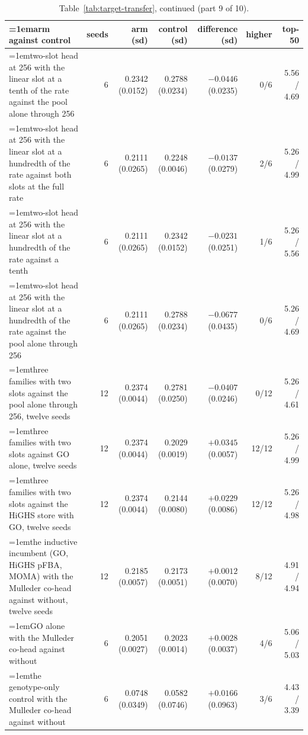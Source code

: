 \begin{table}[H]
  \centering
  \footnotesize
  \setlength{\tabcolsep}{2.5pt}
  \caption[The rounds on betaxanthin: arm against control, continued]{Table~\ref{tab:target-transfer}, continued (part 9 of 10).}
  \label{tab:target-transfer-9}
  \begin{tabular}{@{}>{\raggedright\hangindent=1em\hangafter=1\arraybackslash}p{78.5mm}rrrrrr@{}}
    \hline
    arm against control & seeds & arm (sd) & control (sd) & difference (sd) & higher & top-50 \\
    \hline
    two-slot head at 256 with the linear slot at a tenth of the rate against the pool alone through 256 & 6 & 0.2342 (0.0152) & 0.2788 (0.0234) & $-0.0446$ (0.0235) & 0/6 & 5.56 / 4.69 \\
    two-slot head at 256 with the linear slot at a hundredth of the rate against both slots at the full rate & 6 & 0.2111 (0.0265) & 0.2248 (0.0046) & $-0.0137$ (0.0279) & 2/6 & 5.26 / 4.99 \\
    two-slot head at 256 with the linear slot at a hundredth of the rate against a tenth & 6 & 0.2111 (0.0265) & 0.2342 (0.0152) & $-0.0231$ (0.0251) & 1/6 & 5.26 / 5.56 \\
    two-slot head at 256 with the linear slot at a hundredth of the rate against the pool alone through 256 & 6 & 0.2111 (0.0265) & 0.2788 (0.0234) & $-0.0677$ (0.0435) & 0/6 & 5.26 / 4.69 \\
    three families with two slots against the pool alone through 256, twelve seeds & 12 & 0.2374 (0.0044) & 0.2781 (0.0250) & $-0.0407$ (0.0246) & 0/12 & 5.26 / 4.61 \\
    three families with two slots against GO alone, twelve seeds & 12 & 0.2374 (0.0044) & 0.2029 (0.0019) & $+0.0345$ (0.0057) & 12/12 & 5.26 / 4.99 \\
    three families with two slots against the HiGHS store with GO, twelve seeds & 12 & 0.2374 (0.0044) & 0.2144 (0.0080) & $+0.0229$ (0.0086) & 12/12 & 5.26 / 4.98 \\
    the inductive incumbent (GO, HiGHS pFBA, MOMA) with the Mulleder co-head against without, twelve seeds & 12 & 0.2185 (0.0057) & 0.2173 (0.0051) & $+0.0012$ (0.0070) & 8/12 & 4.91 / 4.94 \\
    GO alone with the Mulleder co-head against without & 6 & 0.2051 (0.0027) & 0.2023 (0.0014) & $+0.0028$ (0.0037) & 4/6 & 5.06 / 5.03 \\
    the genotype-only control with the Mulleder co-head against without & 6 & 0.0748 (0.0349) & 0.0582 (0.0746) & $+0.0166$ (0.0963) & 3/6 & 4.43 / 3.39 \\

\end{tabular}
\end{table}
